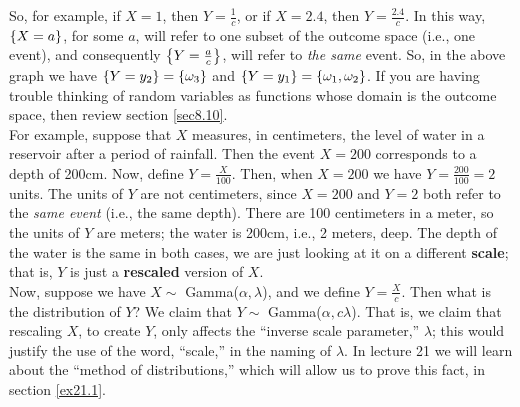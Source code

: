 \noindent So, for example, if $X = 1$, then $Y = \frac{1}{c}$, or if $X = 2.4$, then $Y = \frac{2.4}{c}$. In this way, $\left\{X = a\right\}$, for some $a$, will refer to one subset of the outcome space (i.e., one event), and consequently $\left\{Y = \frac{a}{c}\right\}$, will refer to \textit{the same} event. So, in the above graph we have $\left\{Y = y_2\right\} = \left\{\omega_3\right\}$ and $\left\{Y = y_1\right\} = \left\{\omega_1,\omega_2\right\}$. If you are having trouble thinking of random variables as functions whose domain is the outcome space, then review section \ref{sec8.10}. \\

\noindent For example, suppose that $X$ measures, in centimeters, the level of water in a reservoir after a period of rainfall. Then the event $X = 200$ corresponds to a depth of 200cm. Now, define $Y = \frac{X}{100}$. Then, when $X = 200$ we have $Y = \frac{200}{100} = 2$ units. The units of $Y$ are not centimeters, since $X = 200$ and $Y = 2$ both refer to the \textit{same event} (i.e., the same depth). There are 100 centimeters in a meter, so the units of $Y$ are meters; the water is 200cm, i.e., 2 meters, deep. The depth of the water is the same in both cases, we are just looking at it on a different \textbf{scale}; that is, $Y$ is just a \textbf{rescaled} version of $X$. \\

\noindent Now, suppose we have $X \sim$ Gamma($\alpha,\lambda$), and we define $Y = \frac{X}{c}$. Then what is the distribution of $Y$? We claim that $Y \sim$ Gamma($\alpha,c\lambda$). That is, we claim that rescaling $X$, to create $Y$, only affects the ``inverse scale parameter,'' $\lambda$; this would justify the use of the word, ``scale,'' in the naming of $\lambda$. In lecture 21 we will learn about the ``method of distributions,'' which will allow us to prove this fact, in section \ref{ex21.1}. \\

